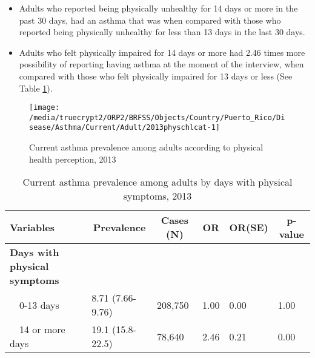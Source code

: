  
\newpage

 \newpage
\begin{itemize}

\item Adults who reported being physically unhealthy for 14 days or more in the past 30 days, had an asthma that was 
 when compared with 
those who reported being physically unhealthy for less than 13 days in the last 30 days.


\item Adults who felt physically impaired for 14 days or more had 2.46 times more possibility of reporting having asthma at the moment of the interview, when compared with those who felt physically impaired for 13 days or less (See Table \ref{tab:phys.Asthma.2013}).

\end{itemize}

\begin{figure}[H]
\caption{Current asthma prevalence among adults according to physical health perception, 2013}
\label{fig:phys.Asthma.2013}
\begin{knitrout}
\color{fgcolor}

{\centering \texttt{[image: /media/truecrypt2/ORP2/BRFSS/Objects/Country/Puerto\_Rico/Disease/Asthma/Current/Adult/2013physchlcat-1]} 

}



\end{knitrout}
 \end{figure}

\begin{table}[H]
\caption{Current asthma prevalence among adults by days with physical symptoms, 2013\label{tab:phys.Asthma.2013}} 
\begin{center}
\begin{tabular}{llllll}
\hline\hline
\multicolumn{1}{l}{Variables}&\multicolumn{1}{c}{Prevalence}&\multicolumn{1}{c}{Cases (N)}&\multicolumn{1}{c}{OR}&\multicolumn{1}{c}{OR(SE)}&\multicolumn{1}{c}{p-value}\tabularnewline
\hline
{\bfseries Days with physical symptoms}&&&&&\tabularnewline
~~0-13 days&8.71 (7.66-9.76)&208,750&1.00&0.00&1.00\tabularnewline
~~14 or more days&19.1 (15.8-22.5)& 78,640&2.46&0.21&0.00\tabularnewline
\hline
\end{tabular}\end{center}

\end{table}



